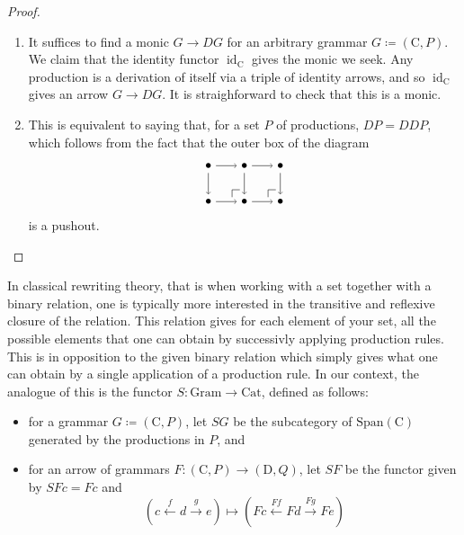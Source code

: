 \documentclass{amsart}
\newcommand{\C}{\cat{C}}
\newcommand{\D}{\cat{D}}
\newcommand{\Cat}{\cat{Cat}}
\newcommand{\Gram}{\cat{Gram}}
\newcommand{\Span}{\cat{Span}}
\newcommand{\cat}[1]{\mathrm{#1}}
\newcommand{\from}{\colon}
\newcommand{\xto}[1]{\xrightarrow{#1}}
\newcommand{\xgets}[1]{\xleftarrow{#1}}
\DeclareMathOperator{\id}{id}
\theoremstyle{remark}
\theoremstyle{definition}
\begin{document}
\begin{proof}
  
  \begin{enumerate}
  \item It suffices to find a monic $ G \to DG $ for an arbitrary
    grammar $ G \coloneqq ( \C , P ) $. We claim that the identity
    functor $ \id_{\C} $ gives the monic we seek. Any production is a
    derivation of itself via a triple of identity arrows, and so
    $ \id_{\C} $ gives an arrow $ G \to DG $. It is straighforward to
    check that this is a monic.
  \item This is equivalent to saying that, for a set $ P $ of
    productions, $ DP = DDP $, which follows from the fact that the
    outer box of the diagram
    \[
      \begin{tikzpicture}
        \node (1) at (0,1) {\( \bullet \)};
        \node (2) at (1,1) {\( \bullet \)};
        \node (3) at (2,1) {\( \bullet \)};
        \node (4) at (0,0) {\( \bullet \)};
        \node (5) at (1,0) {\( \bullet \)};
        \node (6) at (2,0) {\( \bullet \)};
        \draw [->] (1) to node [] {\scriptsize{\(  \)}} (2);
        \draw [->] (2) to node [] {\scriptsize{\(  \)}} (3);
        \draw [->] (4) to node [] {\scriptsize{\(  \)}} (5);
        \draw [->] (5) to node [] {\scriptsize{\(  \)}} (6);
        \draw [->] (1) to node [] {\scriptsize{\(  \)}} (4);
        \draw [->] (2) to node [] {\scriptsize{\(  \)}} (5);
        \draw [->] (3) to node [] {\scriptsize{\(  \)}} (6);
        \node (a) at (0.66,0) {};
        \node (b) at (0.66,0.33) {};
        \node (c) at (1,0.33) {};
        \node (d) at (1.66,0) {};
        \node (e) at (1.66,0.33) {};
        \node (f) at (2,0.33) {};
        \draw (a) -- (b.center);
        \draw (b.center) -- (c);
        \draw (d) -- (e.center);
        \draw (e.center) -- (f);
      \end{tikzpicture}
    \]
    is a pushout.
  \end{enumerate}
  
\end{proof}

In classical rewriting theory, that is when working with a set
together with a binary relation, one is typically more interested in
the transitive and reflexive closure of the relation. This relation
gives for each element of your set, all the possible elements that one
can obtain by successivly applying production rules.  This is in
opposition to the given binary relation which simply gives what one
can obtain by a single application of a production rule.  In our
context, the analogue of this is the functor $ S \from \Gram \to \Cat
$, defined as follows:
%
\begin{itemize}
  \item for a grammar $ G \coloneqq ( \C , P ) $, let $ SG $ be the
    subcategory of $ \Span ( \C ) $ generated by the productions in
    $ P $, and
  \item for an arrow of grammars
    $ F \from ( \C , P ) \to ( \D , Q ) $, let $ SF $ be the functor
    given by $ SFc = Fc $ and
    \[
      ( c \xgets{f} d \xto{g} e )
      \mapsto
      ( Fc \xgets{Ff} Fd \xto{Fg} Fe )
    \]
  \end{itemize}
%
\end{document}
